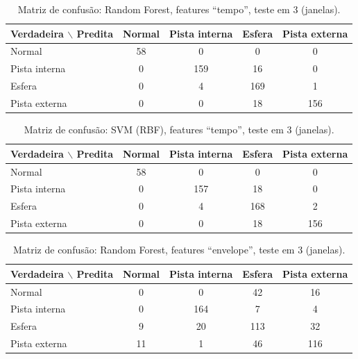 \begin{table}[htb]
  \centering
  \caption{Matriz de confusão: Random Forest, features ``tempo'', teste em \SI{3}{\hp} (janelas).}
  \label{tab:confusao-random-forest-tempo}
  \begin{tabular}{lcccc}
    \toprule
    \textbf{Verdadeira $\backslash$ Predita} & \textbf{Normal} & \textbf{Pista interna} & \textbf{Esfera} & \textbf{Pista externa} \\
    \midrule
    Normal & 58 & 0 & 0 & 0 \\
    Pista interna & 0 & 159 & 16 & 0 \\
    Esfera & 0 & 4 & 169 & 1 \\
    Pista externa & 0 & 0 & 18 & 156 \\
    \bottomrule
  \end{tabular}
\end{table}

\begin{table}[htb]
  \centering
  \caption{Matriz de confusão: SVM (RBF), features ``tempo'', teste em \SI{3}{\hp} (janelas).}
  \label{tab:confusao-svm-tempo}
  \begin{tabular}{lcccc}
    \toprule
    \textbf{Verdadeira $\backslash$ Predita} & \textbf{Normal} & \textbf{Pista interna} & \textbf{Esfera} & \textbf{Pista externa} \\
    \midrule
    Normal & 58 & 0 & 0 & 0 \\
    Pista interna & 0 & 157 & 18 & 0 \\
    Esfera & 0 & 4 & 168 & 2 \\
    Pista externa & 0 & 0 & 18 & 156 \\
    \bottomrule
  \end{tabular}
\end{table}

\begin{table}[htb]
  \centering
  \caption{Matriz de confusão: Random Forest, features ``envelope'', teste em \SI{3}{\hp} (janelas).}
  \label{tab:confusao-random-forest-envelope}
  \begin{tabular}{lcccc}
    \toprule
    \textbf{Verdadeira $\backslash$ Predita} & \textbf{Normal} & \textbf{Pista interna} & \textbf{Esfera} & \textbf{Pista externa} \\
    \midrule
    Normal & 0 & 0 & 42 & 16 \\
    Pista interna & 0 & 164 & 7 & 4 \\
    Esfera & 9 & 20 & 113 & 32 \\
    Pista externa & 11 & 1 & 46 & 116 \\
    \bottomrule
  \end{tabular}
\end{table}

